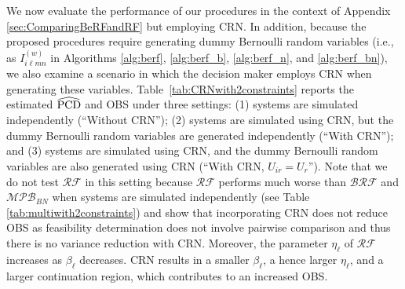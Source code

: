 \documentclass[11pt]{article}
\begin{document}
We now evaluate the performance of our procedures in the context of Appendix \ref{sec:ComparingBeRFandRF} but employing CRN.
In addition, because the proposed procedures require generating dummy Bernoulli random variables (i.e., as $I_{i\ell m n}^{(w)}$ in Algorithms \ref{alg:berf}, \ref{alg:berf_b}, \ref{alg:berf_n}, and \ref{alg:berf_bn}), we also examine a scenario in which the decision maker employs CRN when generating these variables.
Table~\ref{tab:CRNwith2constraints} reports the estimated $\widehat{{\rm PCD}}$ and OBS under three settings: (1) systems are simulated independently (``Without CRN''); (2) systems are simulated using CRN, but the dummy Bernoulli random variables are generated independently (``With CRN''); and (3) systems are simulated using CRN, and the dummy Bernoulli random variables are also generated using CRN (``With CRN, $U_{ir}=U_r$''). Note that we do not test $\mathcal{RF}$ in this setting because $\mathcal{RF}$ performs much worse than $\mathcal{BRF}$ and $\mathcal{MPB}_{BN}$ when systems are simulated independently (see Table \ref{tab:multiwith2constraints}) and  \cite{zhou2022finding} show that incorporating CRN does not reduce OBS as feasibility determination does not involve pairwise comparison and thus there is no variance reduction with CRN. Moreover, the parameter $\eta_\ell$ of $\mathcal{RF}$ increases as $\beta_\ell$ decreases. CRN results in a smaller $\beta_\ell$, a hence larger $\eta_\ell$, and a larger continuation region, which contributes to an increased OBS. 
\end{document}
